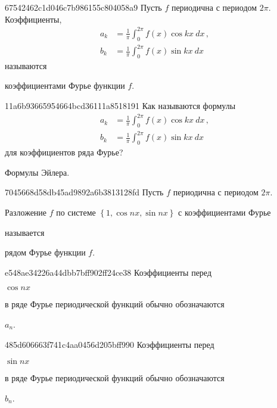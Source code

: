 \begin{note}{67542462c1d046c7b986155c804058a9}
    Пусть \({ f }\) периодична с периодом \({ 2\pi }\).
    Коэффициенты,
    \begin{align*}
        a_k &= \frac{1}{\pi} \int_{0}^{2\pi} f(x) \cos kx\: dx\,, \\
        b_k &= \frac{1}{\pi} \int_{0}^{2\pi} f(x) \sin kx\: dx
    \end{align*}
    называются \begin{icloze}{1}коэффициентами Фурье функции \({ f }\).\end{icloze}
\end{note}

\begin{note}{11a6b93665954664bcd36111a8518191}
    Как называются формулы
    \begin{align*}
        a_k &= \frac{1}{\pi} \int_{0}^{2\pi} f(x) \cos kx\: dx\,, \\
        b_k &= \frac{1}{\pi} \int_{0}^{2\pi} f(x) \sin kx\: dx
    \end{align*}
    для коэффициентов ряда Фурье?

    \begin{cloze}{1}
        Формулы Эйлера.
    \end{cloze}
\end{note}

\begin{note}{7045668d58db45ad9892a6b3813128fd}
    Пусть \({ f }\) периодична с периодом \({ 2\pi }\).
    \begin{icloze}{2}Разложение \({ f }\) по системе \({ \left\{ 1, \cos nx, \sin nx \right\} }\) с коэффициентами Фурье\end{icloze} называется \begin{icloze}{1}рядом Фурье функции \({ f }\).\end{icloze}
\end{note}

\begin{note}{e548ae34226a44dbb7bff902ff24ce38}
    Коэффициенты перед \begin{icloze}{2}\({ \cos nx }\)\end{icloze} в ряде Фурье периодической функций обычно обозначаются \begin{icloze}{1}\({ a_n }\).\end{icloze}
\end{note}

\begin{note}{485d606663f741c4aa0456d205bff990}
    Коэффициенты перед \begin{icloze}{2}\({ \sin nx }\)\end{icloze} в ряде Фурье периодической функций обычно обозначаются \begin{icloze}{1}\({ b_n }\).\end{icloze}
\end{note}

